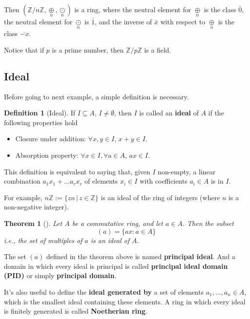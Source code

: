 \documentclass[12pt,a4paper]{article}
\newtheorem{theorem}{Theorem}[section]
\theoremstyle{definition}
\newtheorem{definition}{Definition}[section]
\begin{document}
Then $(\mathbb{Z}/n \mathbb{Z}, \underset{n}{\oplus}, \underset{n}{\odot})$ is a ring, where the neutral element for $\underset{n}{\oplus}$ is the class $\bar{0}$, the neutral element for $\underset{n}{\odot}$ is $\bar{1}$, and the inverse of $\bar{x}$ with respect to $\underset{n}{\oplus}$ is the class $\overline{-x}$.

Notice that if $p$ is a prime number, then $\mathbb{Z} / p\mathbb{Z}$ is a field.

\subsection{Ideal}

Before going to next example, a simple definition is necessary.

\begin{definition}[Ideal]
If \(I \subseteq A\), $I \neq \emptyset$, then \(I\) is called an \textbf{ideal} of \(A\) if the following properties hold
\begin{itemize}
\item
  Closure under addition: \(\forall x, y \in I, \, x+y \in I\).
\item
  Absorption property: \(\forall x \in I, \forall a \in A, \, ax \in I\).
\end{itemize}
\end{definition}

This definition is equivalent to saying that, given $I$ non-empty, a linear combination $a_1x_1 + \ldots a_rx_r$ of elements $x_i \in I$ with coefficients $a_i \in A$ is in $I$.

For example, \(n \mathbb{Z} := \{zn \, | \, z \in \mathbb{Z} \}\) is an ideal of the ring of integers (where \(n\) is a non-negative integer).

\begin{theorem}[]
Let $A$ be a commutative ring, and let $a \in A$. Then the subset 
\[
(a) = \{ax : a \in A \}
\]
i.e., the set of multiples of $a$ is an ideal of $A$.
\end{theorem}

The set $(a)$ defined in the theorem above is named \textbf{principal ideal}. And a domain in which every ideal is principal is called \textbf{principal ideal domain (PID)} or simply \textbf{principal domain}.

It's also useful to define the \textbf{ideal generated by} a set of elements $a_1, \ldots, a_n \in A$, which is the smallest ideal containing these elements. A ring in which every ideal is finitely generated is called \textbf{Noetherian ring}.
\end{document}
